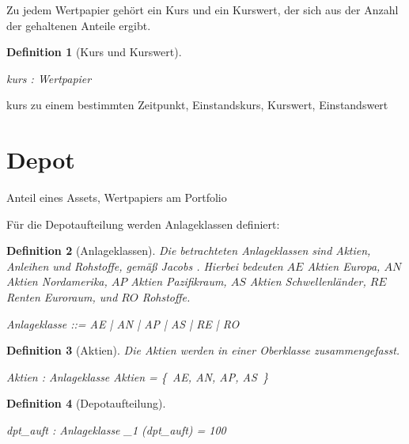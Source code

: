 \documentclass[12pt]{scrartcl}
\newtheorem{genericdef}{Generic Definition}[section]
\newtheorem{zdef}{Definition}[section]
\newcommand{\dsum}{\Sigma}
\begin{document}
Zu jedem Wertpapier gehört ein Kurs und ein Kurswert, der sich aus der
Anzahl der gehaltenen Anteile ergibt.

\begin{zdef}[Kurs und Kurswert]
  \label{zdef:kurs-kurswert}
  \begin{axdef}
    kurs : Wertpapier \fun \Rational\\
  \end{axdef}
\end{zdef}
kurs zu einem bestimmten Zeitpunkt, Einstandskurs, Kurswert,
Einstandswert





\section{Depot}
\label{sec:depot}
Anteil eines Assets, Wertpapiers am Portfolio


Für die Depotaufteilung werden Anlageklassen definiert:

\begin{zdef}[Anlageklassen]
  \label{zdef:anlageklassen}
  Die betrachteten Anlageklassen sind Aktien, Anleihen und Rohstoffe,
  gemäß Jacobs \cite{Jacobs2016}. Hierbei bedeuten $AE$ Aktien Europa,
  $AN$ Aktien Nordamerika, $AP$ Aktien Pazifikraum, $AS$ Aktien
  Schwellenländer, $RE$ Renten Euroraum, und $RO$ Rohstoffe. 
  \begin{zed}
    Anlageklasse ::= AE | AN | AP | AS | RE | RO 
  \end{zed}
\end{zdef}

\begin{zdef}[Aktien]
  \label{zdef:aktien}
  Die Aktien werden in einer Oberklasse zusammengefasst.
  \begin{axdef}
    Aktien : \power Anlageklasse
    \where
    Aktien = \{~AE, AN, AP, AS~\}
  \end{axdef}
\end{zdef}

\begin{zdef}[Depotaufteilung]
  \label{zdef:depotaufteilung}
  \begin{axdef}
    dpt\_auft : Anlageklasse \pfun \nat_1
    \where
    \dsum(dpt\_auft) = 100
  \end{axdef}
\end{zdef}
\end{document}
